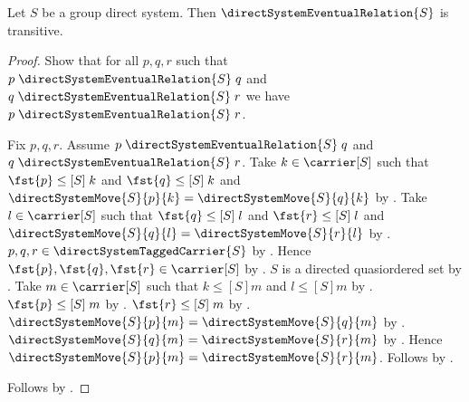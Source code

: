 \begin{proposition}\label{direct_system_eventual_transitive}
    Let $S$ be a group direct system.
    Then $\directSystemEventualRelation{S}$ is transitive.
\end{proposition}
\begin{proof}
    Show that for all $p,q,r$ such that
        $p\mathrel{\directSystemEventualRelation{S}}q$ and
        $q\mathrel{\directSystemEventualRelation{S}}r$ we have
        $p\mathrel{\directSystemEventualRelation{S}}r$.
    \begin{subproof}
        Fix $p,q,r$.
        Assume $p\mathrel{\directSystemEventualRelation{S}}q$ and
            $q\mathrel{\directSystemEventualRelation{S}}r$.
        Take $k\in\carrier[S]$ such that
            $\fst{p}\mathrel{\leq[S]}k$ and
            $\fst{q}\mathrel{\leq[S]}k$ and
            $\directSystemMove{S}{p}{k}
                =\directSystemMove{S}{q}{k}$ by
            .
        Take $l\in\carrier[S]$ such that
            $\fst{q}\mathrel{\leq[S]}l$ and
            $\fst{r}\mathrel{\leq[S]}l$ and
            $\directSystemMove{S}{q}{l}
                =\directSystemMove{S}{r}{l}$ by
            .
        $p,q,r\in\directSystemTaggedCarrier{S}$ by
            .
        Hence $\fst{p},\fst{q},\fst{r}\in\carrier[S]$ by
            .
        $S$ is a directed quasiordered set by
            .
        Take $m\in\carrier[S]$ such that
            $k\mathrel{\leq[S]}m$ and $l\mathrel{\leq[S]}m$ by
            .
        $\fst{p}\mathrel{\leq[S]}m$ by
            .
        $\fst{r}\mathrel{\leq[S]}m$ by
            .
        $\directSystemMove{S}{p}{m}
            =\directSystemMove{S}{q}{m}$ by
            .
        $\directSystemMove{S}{q}{m}
            =\directSystemMove{S}{r}{m}$ by
            .
        Hence $\directSystemMove{S}{p}{m}
            =\directSystemMove{S}{r}{m}$.
        Follows by
            .
    \end{subproof}
    Follows by .
\end{proof}

